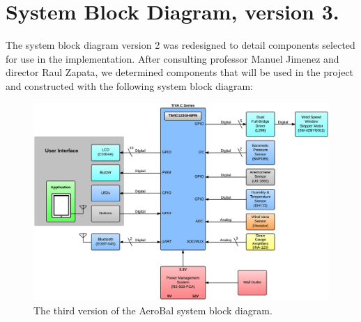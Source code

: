 \section{System Block Diagram, version 3.}
	
	The system block diagram version 2 was redesigned to detail components selected for use in the implementation. After consulting professor Manuel Jimenez and director Raul Zapata, we determined components that will be used in the project and constructed with the following system block diagram:

		
		\begin{figure}[H]
			\centering
				\includegraphics[scale=0.18]{img/sbdv3}
			\caption{The third version of the AeroBal system block diagram.}
		\end{figure}


\newpage